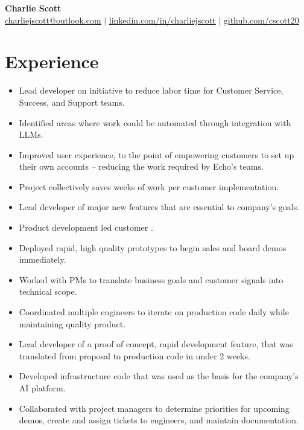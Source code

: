 \documentclass[letterpaper,11pt]{article}
\newenvironment{HeadingList}{
  \begin{mdframed}[
    topline=false,
    bottomline=false,
    rightline=false,
    leftline=false,
    linecolor=gray,
    linewidth=0pt,
    leftmargin=0pt,
    innerleftmargin=0pt,
    innertopmargin=0pt,
    innerbottommargin=0pt,
    innerrightmargin=0pt,
    skipabove=\parsep,
    skipbelow=\parsep,
  ]
  \begin{itemize}[leftmargin=0pt, label={}]
}{
  \end{itemize}
  \end{mdframed}
}
\newenvironment{SubHeadingList}{
  \begin{mdframed}[
    topline=false,
    bottomline=false,
    rightline=false,
    leftline=true,
    linecolor=gray,
    linewidth=.5pt,
    leftmargin=8pt,
    innerleftmargin=8pt,
    innertopmargin=0pt,
    innerbottommargin=0pt,
    innerrightmargin=0pt,
    skipabove=\parsep,
    skipbelow=\parsep,
  ]
  \begin{itemize}[leftmargin=0pt, label={}]
}{
  \end{itemize}
  \end{mdframed}
}
\newenvironment{ItemList}{
  \begin{itemize}[itemsep=4pt, topsep=-3pt, partopsep=0pt, parsep=0pt, leftmargin=20pt, label=\raisebox{0.4ex}{\scalebox{0.5}{\textbullet}}]
}{
  \end{itemize}
}
\newcommand{\Item}[1]{
  \item\small{
    \parbox[t]{460pt}{\raggedright #1}
  }
}
\begin{document}
\begin{center}
    \textbf{\Huge Charlie Scott} \\ \vspace{1pt}
    \href{mailto:charliejscott@outlook.com}{\underline{charliejscott@outlook.com}} $|$
    \href{https://linkedin.com/in/charliejscott}{\underline{linkedin.com/in/charliejscott}} $|$
    \href{https://github.com/cscott20}{\underline{github.com/cscott20}}
\end{center}

\section{Experience}
    \begin{HeadingList}
            \begin{SubHeadingList}
                \begin{ItemList}
                    \Item{Lead developer on initiative to reduce labor time for Customer Service, Success, and Support teams.}
                    \Item{Identified areas where work could be automated through integration with LLMs.}
                    \Item{Improved user experience, to the point of empowering customers to set up their own accounts -- reducing the work required by Echo's teams.}
                    \Item{Project collectively saves weeks of work per customer implementation.}
                \end{ItemList}

                \begin{ItemList}
                    \Item{Lead developer of major new features that are essential to company's goals.}
                    \Item{Product development led customer .}
                    \Item{Deployed rapid, high quality prototypes to begin sales and board demos immediately.}
                    \Item{Worked with PMs to translate business goals and customer signals into technical scope.}
                    \Item{Coordinated multiple engineers to iterate on production code daily while maintaining quality product.}
                \end{ItemList}

                \SubHeading[AI Manager]
                \begin{ItemList}
                    \Item{Lead developer of a proof of concept, rapid development feature, that was translated from proposal to production code in under 2 weeks.}
                    \Item{Developed infrastructure code that was used as the basis for the company's AI platform.}
                    \Item{Collaborated with project managers to determine priorities for upcoming demos, create and assign tickets to engineers, and maintain documentation.}
                \end{ItemList}


\end{SubHeadingList}
\end{HeadingList}
\end{document}
